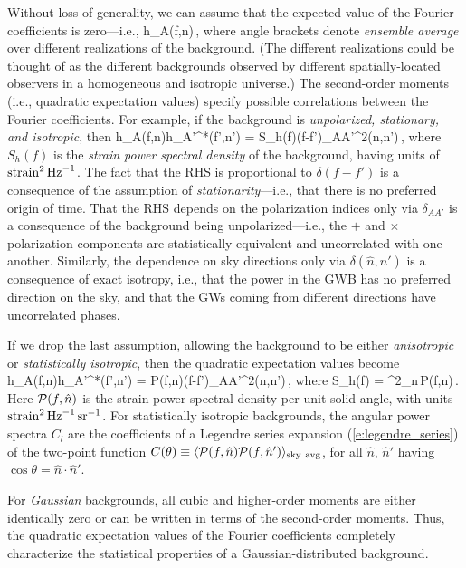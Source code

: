 Without loss of generality, we can assume that the 
expected value of the Fourier coefficients is 
zero---i.e.,
%
\be
\langle h_A(f,\hat n)\,,
\ee
%
where angle brackets denote {\em ensemble average}
over different realizations of the background.
(The different realizations could be thought of 
as the different backgrounds observed by
different spatially-located observers in a homogeneous 
and isotropic universe.)
The second-order moments (i.e., quadratic expectation 
values) specify possible correlations between the 
Fourier coefficients.
For example, if the background is 
{\em unpolarized, stationary, and isotropic}, then
%
\be
\langle h_A(f,\hat n)h_{A'}^*(f',\hat n')\rangle
= S_h(f)\delta(f-f')\delta_{AA'}\delta^2(\hat n,\hat n')\,,
\label{e:quad_iso}
\ee
%
where $S_h(f)$ is the {\em strain power spectral 
density} of the background, 
having units of ${\rm strain}^2\,{\rm Hz}^{-1}$.
The fact that the RHS is proportional 
to $\delta(f-f')$ is a consequence of the assumption
of {\em stationarity}---i.e., that there is no 
preferred origin of time.
That the RHS depends on the polarization indices
only via  $\delta_{AA'}$ is a consequence of the 
background being unpolarized---i.e., the $+$ and $\times$ 
polarization components are statistically
equivalent and uncorrelated with one another.
Similarly, the dependence on sky directions only via 
$\delta(\hat n,\hat n')$ is a consequence of exact 
isotropy,
i.e., that the power in the GWB has no preferred
direction on the sky, and that the GWs coming from
different directions have uncorrelated phases.

If we drop the last assumption, allowing the background
to be either {\em anisotropic} or {\em statistically 
isotropic}, then the quadratic expectation values become
%
\be
\langle h_A(f,\hat n)h_{A'}^*(f',\hat n')\rangle
= {\cal P}(f,\hat n)\delta(f-f')\delta_{AA'}\delta^2(\hat n,\hat n')\,,
\label{e:quad_aniso}
\ee
%
where
%
\be
S_h(f) = \int \D^2\Omega_{\hat n}\,{\cal P}(f,\hat n)\,.
\ee
%
Here ${\cal P}(f,\hat n)$ is the strain power
spectral density per unit solid angle, with 
units ${\rm strain}^2\,{\rm Hz}^{-1}\,{\rm sr}^{-1}$.
For statistically isotropic backgrounds, the angular power 
spectra $C_l$ are the coefficients of a Legendre 
series expansion (\ref{e:legendre_series})
of the two-point function 
$C(\theta)\equiv 
\langle {\cal P}(f,\hat n){\cal P}(f,\hat n')\rangle_{\rm sky\ avg}$, 
for all $\hat n$, $\hat n'$ having 
$\cos\theta = \hat n\cdot \hat n'$.

For {\em Gaussian} backgrounds, all cubic 
and higher-order moments are either identically zero 
or can be written in terms of the second-order moments.
Thus, the quadratic expectation values of the Fourier
coefficients completely characterize the statistical
properties of a Gaussian-distributed background.

